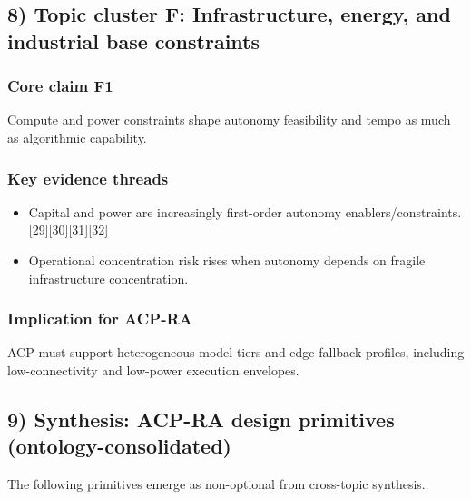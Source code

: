 \documentclass[11pt]{article}
\begin{document}
\hypertarget{topic-cluster-f-infrastructure-energy-and-industrial-base-constraints}{%
\subsection{8) Topic cluster F: Infrastructure, energy, and industrial
base
constraints}\label{topic-cluster-f-infrastructure-energy-and-industrial-base-constraints}}

\hypertarget{core-claim-f1}{%
\subsubsection{Core claim F1}\label{core-claim-f1}}

Compute and power constraints shape autonomy feasibility and tempo as
much as algorithmic capability.

\hypertarget{key-evidence-threads-5}{%
\subsubsection{Key evidence threads}\label{key-evidence-threads-5}}

\begin{itemize}
\tightlist
\item
  Capital and power are increasingly first-order autonomy
  enablers/constraints. {[}29{]}{[}30{]}{[}31{]}{[}32{]}
\item
  Operational concentration risk rises when autonomy depends on fragile
  infrastructure concentration.
\end{itemize}

\hypertarget{implication-for-acp-ra-5}{%
\subsubsection{Implication for ACP-RA}\label{implication-for-acp-ra-5}}

ACP must support heterogeneous model tiers and edge fallback profiles,
including low-connectivity and low-power execution envelopes.

\hypertarget{synthesis-acp-ra-design-primitives-ontology-consolidated}{%
\subsection{9) Synthesis: ACP-RA design primitives
(ontology-consolidated)}\label{synthesis-acp-ra-design-primitives-ontology-consolidated}}

The following primitives emerge as non-optional from cross-topic
synthesis.
\end{document}
